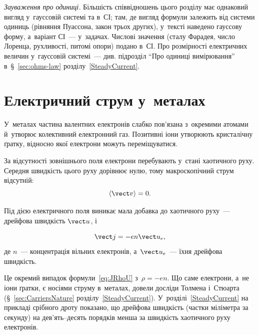 \begin{Attention}
	\emph{Зауваження про одиниці.} Більшість співвідношень цього розділу має однаковий
	вигляд у~гауссовій системі та в~СІ; там, де вигляд формули залежить від системи
	одиниць (рівняння Пуассона, закон трьох других), у~тексті наведено гауссову форму,
	а~варіант СІ~--- у~задачах. Числові значення (сталу Фарадея, число Лоренца,
	рухливості, питомі опори) подано в~СІ. Про розмірності електричних величин у~гауссовій
	системі~--- див. підрозділ \enquote{Про одиниці вимірювання}
	в~\S~\ref{sec:ohms-law} розділу~\ref{SteadyCurrent}.
\end{Attention}


\section{Електричний струм у~металах}\label{sec:CurrentInMetals}\hypertarget{current-in-metals}{}


У~металах частина валентних електронів слабко пов'язана з~окремими атомами й~утворює
колективний електронний газ. Позитивні іони утворюють кристалічну ґратку, відносно якої
електрони можуть переміщуватися.

За відсутності зовнішнього поля електрони перебувають у~стані хаотичного руху. Середня
швидкість цього руху дорівнює нулю, тому макроскопічний струм відсутній:
\begin{equation*}
	\langle\vect v\rangle = 0.
\end{equation*}

Під дією електричного поля виникає мала добавка до хаотичного руху~--- дрейфова швидкість
$\vect u$, і

\begin{equation*}
	\vect j = -en\vect u_e,
\end{equation*}
де $n$~--- концентрація вільних електронів, а~$\vect u_e$~--- їхня дрейфова швидкість.

Це окремий випадок формули~\eqref{eq:JRhoU} з~$\rho=-en$. Що саме електрони, а~не іони
ґратки, є носіями струму в~металах, довели досліди Толмена і~Стюарта
(\S~\ref{sec:CarriersNature} розділу~\ref{SteadyCurrent}). У~розділі~\ref{SteadyCurrent} на прикладі срібного дроту
показано, що дрейфова швидкість (частки міліметра за секунду) на дев'ять--десять порядків
менша за швидкість хаотичного руху електронів.


